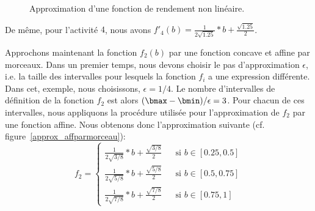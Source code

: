 \begin{ex}
\begin{figure}[!htb]
{}
    \caption{Approximation d'une fonction de rendement non linéaire.}
    \label{approx}
  \end{figure}

  De même, pour l'activité $4$, nous avons
  $f'_4(b)=\frac{1}{2\sqrt{1.25}}*b+ \frac{\sqrt{1.25}}{2}$.

  Approchons maintenant la fonction $f_2(b)$  par une
  fonction concave et affine par morceaux. Dans un premier temps,
  nous devons choisir le pas d'approximation $\epsilon$, i.e. la taille
  des intervalles pour lesquels la fonction $f_i$ a une
  expression différente. Dans cet, exemple, nous choisissons,
  $\epsilon=1/4$. Le nombre d'intervalles de définition de la fonction
  $f_2$ est alors $(\bmax-\bmin)/\epsilon=3$. Pour chacun de ces
  intervalles, nous appliquons la procédure utilisée pour
  l'approximation de $f_2$ par une fonction affine. Nous obtenons donc
  l'approximation suivante (cf. figure~\ref{approx_affparmorceau}):
  \[f_2=\left\{ 
      \begin{array}{lll}
        \frac{1}{2\sqrt{3/8}}*b + \frac{\sqrt{3/8}}{2}& & \text{si } b \in
                                                          [0.25,0.5]\\
        \frac{1}{2\sqrt{5/8}}*b + \frac{\sqrt{5/8}}{2}& & \text{si } b \in [0.5,0.75]\\
        \frac{1}{2\sqrt{7/8}}*b + \frac{\sqrt{7/8}}{2}& & \text{si } b \in [0.75,1]
      \end{array}
    \right.\]
  
\end{ex}

